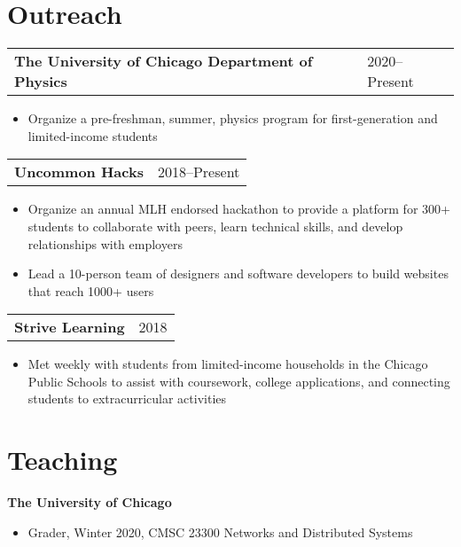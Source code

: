 \documentclass[letterpaper, 11pt]{article}
\begin{document}
\section{Outreach}
\begin{tabular}{@{} L{12cm} @{} R{4.51cm} @{}}
  \textbf{The University of Chicago Department of Physics} & 2020--Present\\
\end{tabular}
\begin{itemize}
\item Organize a pre-freshman, summer, physics program for first-generation and limited-income
  students
\end{itemize}

\begin{tabular}{@{} L{12cm} @{} R{4.51cm} @{}}
  \textbf{Uncommon Hacks} & 2018--Present\\
\end{tabular}
\begin{itemize}
\item Organize an annual MLH endorsed hackathon to provide a platform for 300+
  students to collaborate with peers, learn technical skills,
  and develop relationships with employers
\item Lead a 10-person team of designers and software developers
  to build websites that reach 1000+ users
\end{itemize}

\begin{tabular}{@{} L{12cm} @{} R{4.51cm} @{}}
  \textbf{Strive Learning} & 2018\\
\end{tabular}
\begin{itemize}
\item Met weekly with students from limited-income households in the Chicago Public Schools
  to assist with coursework, college applications, and connecting
  students to extracurricular activities
\end{itemize}

\section{Teaching}
\textbf{The University of Chicago}
\begin{itemize}
  \item Grader, Winter 2020, CMSC 23300 Networks and Distributed Systems
\end{itemize}

\end{document}
